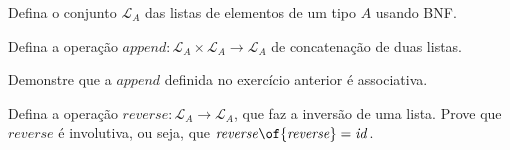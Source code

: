 \def\List#1{{\mathcal L}_{#1}}
\def\append{{\mathit {append}}}
\def\reverse{{\mathit {reverse}}}
\def\id{{\mathit {id}}}

\begin{exercise}
\label{lists-def}
Defina o conjunto $\List A$ das listas de elementos de um tipo $A$ usando BNF.
\end{exercise}

\begin{exercise}
Defina a operação $\append: \List A \times \List A \to \List A$ de concatenação de duas listas.
\end{exercise}

\begin{exercise}
Demonstre que a $\append$ definida no exercício anterior é associativa.
\end{exercise}

\begin{homework}
Defina a operação $\reverse: \List A \to \List A$, que faz a inversão de uma lista.
Prove que $\reverse$ é involutiva, ou seja, que $\reverse\of\reverse = \id$.
\end{homework}

